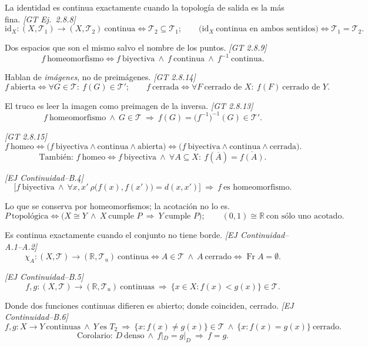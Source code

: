 \documentclass[11pt,a4paper]{article}
\theoremstyle{definition}
\theoremstyle{plain}
\newcommand{\fnt}[1]{{\normalfont\small\itshape\color{gray!150!black}[#1]}}
\newcommand{\R}{\mathbb{R}}
\newcommand{\cl}[1]{\overline{#1}}
\newcommand{\fr}{\operatorname{Fr}}
\newcommand{\tp}{\mathcal{T}}
\begin{document}
\begin{itemize}[leftmargin=1.3em,itemsep=3pt]
 La identidad es continua exactamente cuando la topología de salida es la más fina. \fnt{GT Ej.\ 2.8.8}
\[ \mathrm{id}_X:(X,\tp_1)\to(X,\tp_2)\ \text{continua}\iff \tp_2\subseteq\tp_1;\qquad
\big(\mathrm{id}_X\ \text{continua en ambos sentidos}\big)\iff \tp_1=\tp_2. \]

 Dos espacios que son el mismo salvo el nombre de los puntos. \fnt{GT 2.8.9}
\[ f\ \text{homeomorfismo}\iff f\ \text{biyectiva}\ \wedge\ f\ \text{continua}\ \wedge\ f^{-1}\ \text{continua}. \]

 Hablan de \emph{imágenes}, no de preimágenes. \fnt{GT 2.8.14}
\[ f\ \text{abierta}\iff \forall G\in\tp:\ f(G)\in\tp';\qquad
f\ \text{cerrada}\iff \forall F\ \text{cerrado de } X:\ f(F)\ \text{cerrado de } Y. \]

 El truco es leer la imagen como preimagen de la inversa. \fnt{GT 2.8.13}
\[ f\ \text{homeomorfismo}\ \wedge\ G\in\tp\ \Rightarrow\ f(G)=\big(f^{-1}\big)^{-1}(G)\in\tp'. \]

 \fnt{GT 2.8.15}
\[ f\ \text{homeo}\iff \big(f\ \text{biyectiva}\wedge\text{continua}\wedge\text{abierta}\big)\iff\big(f\ \text{biyectiva}\wedge\text{continua}\wedge\text{cerrada}\big). \]
\[ \text{También: } f\ \text{homeo}\iff f\ \text{biyectiva}\ \wedge\ \forall A\subseteq X:\ f(\cl A)=\cl{f(A)}. \]

 \fnt{EJ Continuidad--B.4}
\[ \big[f\ \text{biyectiva}\ \wedge\ \forall x,x'\ \rho\big(f(x),f(x')\big)=d(x,x')\big]\ \Rightarrow\ f\ \text{es homeomorfismo}. \]

 Lo que se conserva por homeomorfismos; la acotación no lo es.
\[ P\ \text{topológica}\iff \big(X\cong Y\ \wedge\ X\ \text{cumple } P\ \Rightarrow\ Y\ \text{cumple } P\big);\qquad (0,1)\cong\R\ \text{con sólo uno acotado}. \]

 Es continua exactamente cuando el conjunto no tiene borde. \fnt{EJ Continuidad--A.1--A.2}
\[ \chi_A:(X,\tp)\to(\R,\tp_u)\ \text{continua}\iff A\in\tp\ \wedge\ A\ \text{cerrado}\iff \fr A=\emptyset. \]

 \fnt{EJ Continuidad--B.5}
\[ f,g:(X,\tp)\to(\R,\tp_u)\ \text{continuas}\ \Rightarrow\ \{x\in X: f(x)<g(x)\}\in\tp. \]

 Donde dos funciones continuas difieren es abierto; donde coinciden, cerrado. \fnt{EJ Continuidad--B.6}
\[ f,g:X\to Y\ \text{continuas}\ \wedge\ Y\ \text{es } T_2\ \Rightarrow\ \{x: f(x)\ne g(x)\}\in\tp\ \wedge\ \{x: f(x)=g(x)\}\ \text{cerrado}. \]
\[ \text{Corolario: } D\ \text{denso}\ \wedge\ f|_D=g|_D\ \Rightarrow\ f=g. \]


\end{itemize}
\end{document}
